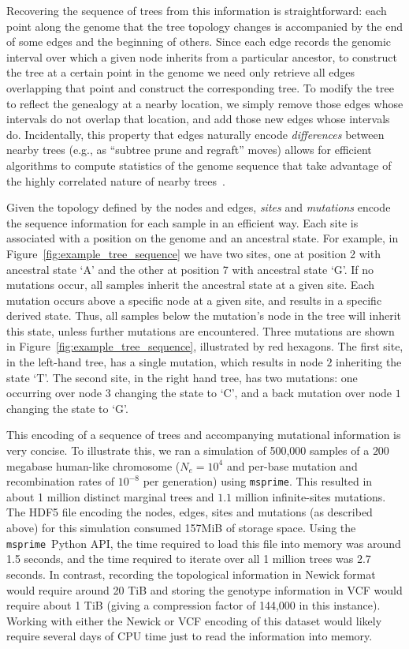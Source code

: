 \documentclass{article}
\newcommand{\msprime}{\texttt{msprime}}
\begin{document}
Recovering the sequence of trees from this information is straightforward:
each point along the genome that the tree topology changes
is accompanied by the end of some {edges} and the beginning of others.
Since each {edge} records the genomic interval
over which a given node inherits from a particular ancestor,
to construct the tree at a certain point in the genome
we need only retrieve all edges overlapping that point
and construct the corresponding tree.
To modify the tree to reflect the genealogy at a nearby location,
we simply remove those edges whose intervals do not overlap that location,
and add those new edges whose intervals do.
Incidentally, this property that edges naturally encode \emph{differences}
between nearby trees (e.g., as ``subtree prune and regraft'' moves)
allows for efficient algorithms to compute statistics of the genome sequence that take advantage
of the highly correlated nature of nearby trees~\citep{kelleher2016efficient}.

Given the topology defined by the nodes and edges, \emph{sites} and \emph{mutations}
encode the sequence information for each sample in an efficient way. Each site
is associated with a position on the genome and an ancestral state. For example,
in Figure~\ref{fig:example_tree_sequence} we have two sites, one at position
2 with ancestral state `A' and the other at position 7 with ancestral state `G'. If
no mutations occur, all samples inherit the ancestral state at a given site.
Each mutation occurs above a specific node at a given site,
and results in a specific derived state.
Thus, all samples below the mutation's node in the tree will inherit this state,
unless further mutations are encountered.
Three mutations are shown in Figure~\ref{fig:example_tree_sequence},
illustrated by red hexagons.
The first site, in the left-hand tree,
has a single mutation, which results in node $2$ inheriting the state `T'.
The second site, in the right hand tree, has two mutations:
one occurring over node $3$ changing the state to `C',
and a back mutation over node $1$ changing the state to `G'.

This encoding of a sequence of trees and accompanying mutational information is
very concise. To illustrate this, we ran a simulation of 500,000 samples of a
$200$ megabase human-like chromosome ($N_e=10^4$ and per-base mutation and
recombination rates of $10^{-8}$ per generation) using \msprime. This resulted
in about 1 million distinct marginal trees and $1.1$ million infinite-sites
mutations. The HDF5 file encoding the nodes, edges, sites and mutations (as
described above) for this simulation consumed 157MiB of storage space. Using
the \msprime\ Python API, the time required to load this file into memory was
around 1.5 seconds, and the time required to iterate over all 1 million trees
was 2.7 seconds. In contrast, recording the topological information in Newick
format would require around 20 TiB and storing the genotype information
in VCF would require about 1 TiB (giving a compression factor of 144,000 in
this instance).
Working with either the Newick or VCF encoding
of this dataset would likely require several
days of CPU time just to read the information into memory.
\end{document}
